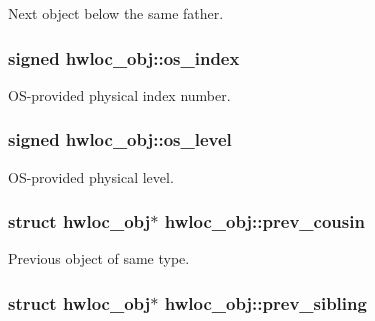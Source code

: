 Next object below the same father. \hypertarget{structhwloc__obj_a79d45afa49e2bd18297660ac68820d91}{
\subsubsection[{os\_\-index}]{\setlength{\rightskip}{0pt plus 5cm}signed {\bf hwloc\_\-obj::os\_\-index}}}
\label{structhwloc__obj_a79d45afa49e2bd18297660ac68820d91}


OS-\/provided physical index number. \hypertarget{structhwloc__obj_a68766f0b1c4d61b5bad87e3b81dacfde}{
\subsubsection[{os\_\-level}]{\setlength{\rightskip}{0pt plus 5cm}signed {\bf hwloc\_\-obj::os\_\-level}}}
\label{structhwloc__obj_a68766f0b1c4d61b5bad87e3b81dacfde}


OS-\/provided physical level. \hypertarget{structhwloc__obj_ac715989f55ff5a0eb6be2969ee477ec0}{
\subsubsection[{prev\_\-cousin}]{\setlength{\rightskip}{0pt plus 5cm}struct {\bf hwloc\_\-obj}$\ast$ {\bf hwloc\_\-obj::prev\_\-cousin}}}
\label{structhwloc__obj_ac715989f55ff5a0eb6be2969ee477ec0}


Previous object of same type. \hypertarget{structhwloc__obj_a7b89e8c189876c0158a9282aaaf17f50}{
\subsubsection[{prev\_\-sibling}]{\setlength{\rightskip}{0pt plus 5cm}struct {\bf hwloc\_\-obj}$\ast$ {\bf hwloc\_\-obj::prev\_\-sibling}}}
\label{structhwloc__obj_a7b89e8c189876c0158a9282aaaf17f50}


